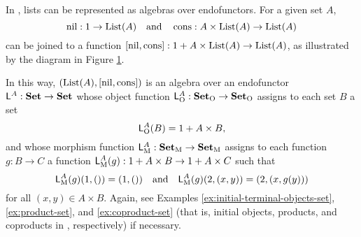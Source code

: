 \begin{example}

  \label{ex:algebra-lists}


  In \set, lists can be represented as algebras over endofunctors. For
  a given set $A$,
  \begin{equation*}
    \operatorname{nil}: 1 \to \text{List}(A)
    \quad
    \text{and}
    \quad
    \operatorname{cons}: A \times \text{List}(A) \to \text{List}(A)
  \end{equation*}
  can be joined to a function $[\operatorname{nil},\operatorname{cons}]: 1 + A \times \text{List}(A)
  \to \text{List}(A)$, as illustrated by the diagram in Figure
  \ref{fig:coproduct-lists}.
  \begin{figure}[htbp]
    \begin{center}
    \end{center}
    \caption{}
    \label{fig:coproduct-lists}
  \end{figure}
  In this way, $(\text{List}(A),[\operatorname{nil},\operatorname{cons}])$ is an algebra over an
  endofunctor $\mathsf{L}^{A}: \mathbf{Set} \to \mathbf{Set}$ whose object function
  $\mathsf{L}_{\operatorname{O}}^{A}: \mathcal{\mathbf{Set}}_{\operatorname{O}} \to \mathcal{\mathbf{Set}}_{\operatorname{O}}$ assigns to each set $B$
  a set
  \begin{equation}
    \mathsf{L}_{\operatorname{O}}^{A}(B) = 1 + A \times B
    \text{,}
  \end{equation}
  and whose morphism function $\mathsf{L}_{\operatorname{M}}^{A}: \mathcal{\mathbf{Set}}_{\operatorname{M}} \to
  \mathcal{\mathbf{Set}}_{\operatorname{M}}$ assigns to each function $g: B \to C$ a function
  $\mathsf{L}_{\operatorname{M}}^{A}(g): 1 + A \times B \to 1 + A \times C$ such that
  \begin{equation}
    \mathsf{L}_{\operatorname{M}}^{A}(g)(1,()) = (1,())
    \quad
    \text{and}
    \quad
    \mathsf{L}_{\operatorname{M}}^{A}(g)(2,(x,y)) = (2,(x,g(y)))
  \end{equation}
  for all $(x,y) \in A \times B$. Again, see Examples
  \ref{ex:initial-terminal-objects-set}, \ref{ex:product-set}, and
  \ref{ex:coproduct-set} (that is, initial objects, products, and
  coproducts in \set, respectively) if necessary.

\end{example}

